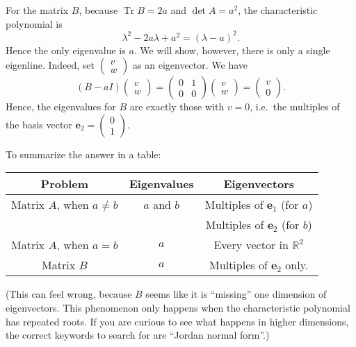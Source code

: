 \documentclass[addpoints, 12pt,answers]{exam}
\begin{document}
\begin{questions}
\begin{solution}
  For the matrix $B$, because $\operatorname{Tr} B = 2a$ and $\det A = a^2$,
  the characteristic polynomial is
  \[ \lambda^2 - 2a \lambda + a^2 = (\lambda-a)^2. \]
  Hence the only eigenvalue is $a$.
  We will show, however, there is only a single eigenline.
  Indeed, set $\begin{pmatrix} v \\ w \end{pmatrix}$ as an eigenvector.
  We have
  \[
    (B - aI) \begin{pmatrix} v \\ w \end{pmatrix}
    = \begin{pmatrix} 0 & 1 \\ 0 & 0 \end{pmatrix}
    \begin{pmatrix} v \\ w \end{pmatrix}
    = \begin{pmatrix} v \\ 0 \end{pmatrix}.
  \]
  Hence, the eigenvalues for $B$ are exactly those with $v = 0$,
  i.e.\ the multiples of the basis vector $\mathbf{e}_2 = \begin{pmatrix} 0 \\ 1 \end{pmatrix}$.

  To summarize the answer in a table:
  \begin{center}
    \begin{tabular}{ccc}
      Problem & Eigenvalues & Eigenvectors \\ \hline
      Matrix $A$, when $a \neq b$ & $a$ and $b$ & Multiples of $\mathbf{e}_1$ (for $a$) \\
      && Multiples of $\mathbf{e}_2$ (for $b$) \\
      Matrix $A$, when $a = b$ & $a$ & Every vector in $\mathbb{R}^2$ \\
      Matrix $B$ & $a$ & Multiples of $\mathbf{e}_2$ only.
    \end{tabular}
  \end{center}

  (This can feel wrong, because $B$ seems like it is ``missing''
  one dimension of eigenvectors.
  This phenomenon only happens when the characteristic polynomial has repeated roots.
  If you are curious to see what happens in higher dimensions,
  the correct keywords to search for are ``Jordan normal form''.)
\end{solution}

\end{questions}
\end{document}
